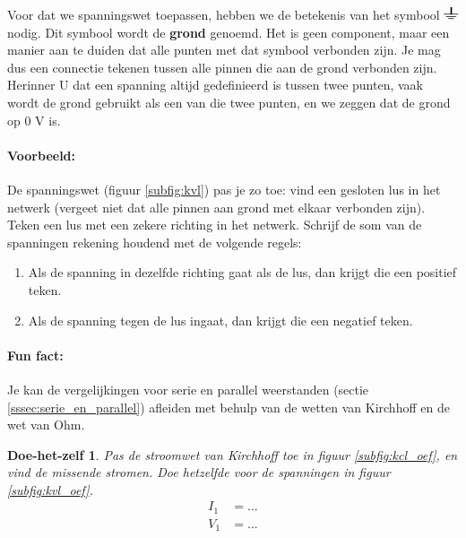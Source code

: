 \documentclass{article}
\newtheorem{DIY}{Doe-het-zelf}
\begin{document}
			Voor dat we spanningswet toepassen, hebben we de betekenis van het symbool \includegraphics[height=1em]{gnd.pdf} nodig. Dit symbool wordt de \textbf{grond} genoemd. Het is geen component, maar een manier aan te duiden dat alle punten met dat symbool verbonden zijn. Je mag dus een connectie tekenen tussen alle pinnen die aan de grond verbonden zijn. Herinner U dat een spanning altijd gedefinieerd is tussen twee punten, vaak wordt de grond gebruikt als een van die twee punten, en we zeggen dat de grond op 0 V is.

			\paragraph*{Voorbeeld:} De spanningswet (figuur \ref{subfig:kvl}) pas je zo toe: vind een gesloten lus in het netwerk (vergeet niet dat alle pinnen aan grond met elkaar verbonden zijn). Teken een lus met een zekere richting in het netwerk. Schrijf de som van de spanningen rekening houdend met de volgende regels:

			\begin{enumerate}
			 	\item Als de spanning in dezelfde richting gaat als de lus, dan krijgt die een positief teken.
			 	\item Als de spanning tegen de lus ingaat, dan krijgt die een negatief teken.
			 \end{enumerate}


			\paragraph*{Fun fact:} Je kan de vergelijkingen voor serie en parallel weerstanden (sectie \ref{sssec:serie_en_parallel}) afleiden met behulp van de wetten van Kirchhoff en de wet van Ohm.

			\begin{DIY} Pas de stroomwet van Kirchhoff toe in figuur \ref{subfig:kcl_oef}, en vind de missende stromen. Doe hetzelfde voor de spanningen in figuur \ref{subfig:kvl_oef}.
			\begin{align}
			    I_1 &= \ldots \\
			    V_1 &= \ldots \\
			\end{align}
			\end{DIY}
\end{document}
